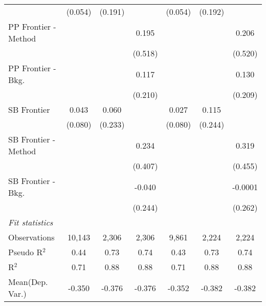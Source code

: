 \begin{tabular}{lcccccc}
                        & (0.054)        & (0.191) &              & (0.054)        & (0.192) &   \\   
   PP Frontier - Method &                &         & 0.195        &                &         & 0.206\\   
                        &                &         & (0.518)      &                &         & (0.520)\\   
   PP Frontier - Bkg.   &                &         & 0.117        &                &         & 0.130\\   
                        &                &         & (0.210)      &                &         & (0.209)\\   
   SB Frontier          & 0.043          & 0.060   &              & 0.027          & 0.115   &   \\   
                        & (0.080)        & (0.233) &              & (0.080)        & (0.244) &   \\   
   SB Frontier - Method &                &         & 0.234        &                &         & 0.319\\   
                        &                &         & (0.407)      &                &         & (0.455)\\   
   SB Frontier - Bkg.   &                &         & -0.040       &                &         & -0.0001\\   
                        &                &         & (0.244)      &                &         & (0.262)\\   
   \midrule
   \emph{Fit statistics}\\
   Observations         & 10,143         & 2,306   & 2,306        & 9,861          & 2,224   & 2,224\\  
   Pseudo R$^2$         & 0.44           & 0.73    & 0.74         & 0.43           & 0.73    & 0.74\\  
   R$^2$                & 0.71           & 0.88    & 0.88         & 0.71           & 0.88    & 0.88\\  
Mean(Dep. Var.) & -0.350 & -0.376 & -0.376 & -0.352 & -0.382 & -0.382 \\
   

\end{tabular}
